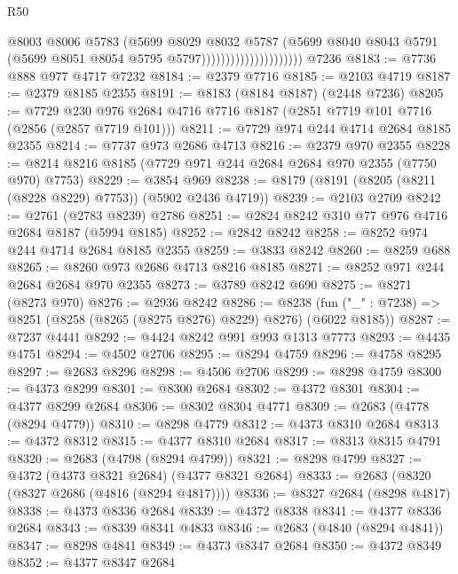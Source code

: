 \begin{lexlean}{R50}
\begin{coremodule}
                                        @8003
                                        @8006
                                        @5783
                                        (@5699
                                          @8029
                                          @8032
                                          @5787
                                          (@5699
                                            @8040
                                            @8043
                                            @5791
                                            (@5699 @8051 @8054 @5795 @5797)))))))))))))))))))))
    @7236
@8183 := @7736 @888 @977 @4717 @7232
@8184 := @2379 @7716
@8185 := @2103 @4719
@8187 := @2379 @8185 @2355
@8191 := @8183 (@8184 @8187) (@2448 @7236)
@8205 := @7729 @230 @976 @2684 @4716 @7716 @8187 (@2851 @7719 @101 @7716 (@2856 (@2857 @7719 @101)))
@8211 := @7729 @974 @244 @4714 @2684 @8185 @2355
@8214 := @7737 @973 @2686 @4713
@8216 := @2379 @970 @2355
@8228 := @8214 @8216 @8185 (@7729 @971 @244 @2684 @2684 @970 @2355 (@7750 @970) @7753)
@8229 := @3854 @969
@8238 := @8179 (@8191 (@8205 (@8211 (@8228 @8229) @7753)) (@5902 @2436 @4719))
@8239 := @2103 @2709
@8242 := @2761 (@2783 @8239) @2786
@8251 := @2824 @8242 @310 @77 @976 @4716 @2684 @8187 (@5994 @8185)
@8252 := @2842 @8242
@8258 := @8252 @974 @244 @4714 @2684 @8185 @2355
@8259 := @3833 @8242
@8260 := @8259 @688
@8265 := @8260 @973 @2686 @4713 @8216 @8185
@8271 := @8252 @971 @244 @2684 @2684 @970 @2355
@8273 := @3789 @8242 @690
@8275 := @8271 (@8273 @970)
@8276 := @2936 @8242
@8286 := @8238 (fun ("_" : @7238) => @8251 (@8258 (@8265 (@8275 @8276) @8229) @8276) (@6022 @8185))
@8287 := @7237 @4441
@8292 := @4424 @8242 @991 @993 @1313 @7773
@8293 := @4435 @4751
@8294 := @4502 @2706
@8295 := @8294 @4759
@8296 := @4758 @8295
@8297 := @2683 @8296
@8298 := @4506 @2706
@8299 := @8298 @4759
@8300 := @4373 @8299
@8301 := @8300 @2684
@8302 := @4372 @8301
@8304 := @4377 @8299 @2684
@8306 := @8302 @8304 @4771
@8309 := @2683 (@4778 (@8294 @4779))
@8310 := @8298 @4779
@8312 := @4373 @8310 @2684
@8313 := @4372 @8312
@8315 := @4377 @8310 @2684
@8317 := @8313 @8315 @4791
@8320 := @2683 (@4798 (@8294 @4799))
@8321 := @8298 @4799
@8327 := @4372 (@4373 @8321 @2684) (@4377 @8321 @2684)
@8333 := @2683 (@8320 (@8327 @2686 (@4816 (@8294 @4817))))
@8336 := @8327 @2684 (@8298 @4817)
@8338 := @4373 @8336 @2684
@8339 := @4372 @8338
@8341 := @4377 @8336 @2684
@8343 := @8339 @8341 @4833
@8346 := @2683 (@4840 (@8294 @4841))
@8347 := @8298 @4841
@8349 := @4373 @8347 @2684
@8350 := @4372 @8349
@8352 := @4377 @8347 @2684

\end{coremodule}
\end{lexlean}
